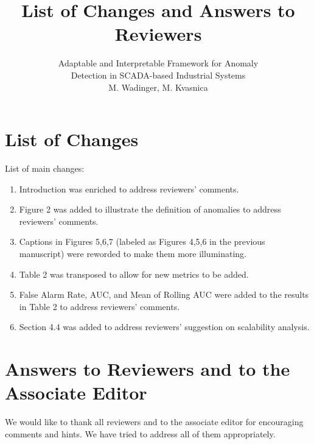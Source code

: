 \documentclass{article}
\title{List of Changes and Answers to Reviewers}
\author{Adaptable and Interpretable Framework for Anomaly\\Detection in SCADA-based Industrial Systems
  \\M. Wadinger, M. Kvasnica}
\begin{document}
\maketitle


\section{List of Changes}

List of main changes:
\begin{enumerate}

  \item Introduction was enriched to address reviewers' comments.
  \item Figure 2 was added to illustrate the definition of anomalies to address reviewers' comments.
  \item Captions in Figures 5,6,7 (labeled as Figures 4,5,6 in the previous manuscript) were reworded to make them more illuminating.
  \item Table 2 was transposed to allow for new metrics to be added.
  \item False Alarm Rate, AUC, and Mean of Rolling AUC were added to the results in Table 2 to address reviewers' comments.
  \item Section 4.4 was added to address reviewers' suggestion on scalability analysis.
\end{enumerate}

\section{Answers to Reviewers and to the Associate Editor}

We would like to thank all reviewers and to the associate editor for
encouraging comments and hints. We have tried to address all of them
appropriately.
\end{document}
